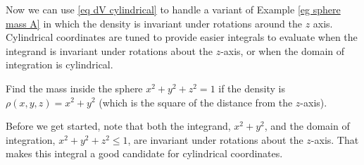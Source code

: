 Now we can use \eqref{eq dV cylindrical} to handle a variant of 
Example \ref{eg sphere mass A}
in which the density is invariant under rotations around the $z$ axis.
Cylindrical coordinates are tuned to provide easier integrals to 
evaluate when the integrand is invariant under rotations about the $z$-axis,
or when the domain of integration is cylindrical.


\begin{eg}\label{eg sphere mass B}
Find the mass inside the sphere $x^2+y^2+z^2=1$ if the density
is $\rho(x,y,z) = x^2+y^2$ (which is the square of the 
distance from the $z$-axis).

\soln
Before we get started, note that both the integrand, $x^2+y^2$, 
and the domain of integration, $x^2+y^2+z^2\le 1$, are invariant under rotations about the $z$-axis. That makes this
integral a good candidate for cylindrical coordinates.


\end{eg}
